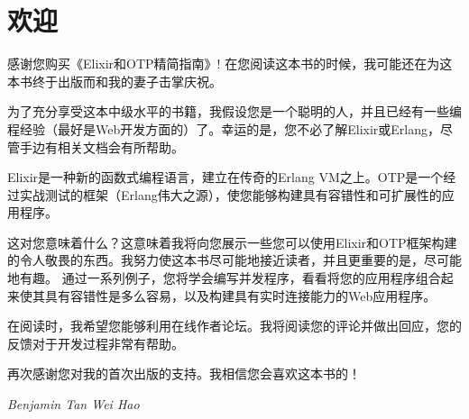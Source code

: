 \chapter*{欢迎}\label{welcome}

感谢您购买《Elixir和OTP精简指南》! 在您阅读这本书的时候，我可能还在为这本书终于出版而和我的妻子击掌庆祝。

为了充分享受这本中级水平的书籍，我假设您是一个聪明的人，并且已经有一些编程经验（最好是Web开发方面的）了。幸运的是，您不必了解Elixir或Erlang，尽管手边有相关文档会有所帮助。

Elixir是一种新的函数式编程语言，建立在传奇的Erlang VM之上。OTP是一个经过实战测试的框架（Erlang伟大之源），使您能够构建具有容错性和可扩展性的应用程序。

这对您意味着什么？这意味着我将向您展示一些您可以使用Elixir和OTP框架构建的令人敬畏的东西。我努力使这本书尽可能地接近读者，并且更重要的是，尽可能地有趣。
通过一系列例子，您将学会编写并发程序，看看将您的应用程序组合起来使其具有容错性是多么容易，以及构建具有实时连接能力的Web应用程序。

在阅读时，我希望您能够利用在线作者论坛。我将阅读您的评论并做出回应，您的反馈对于开发过程非常有帮助。

再次感谢您对我的首次出版的支持。我相信您会喜欢这本书的！

\vspace{2cm} 

\hspace{0.5\textwidth}\textit{Benjamin Tan Wei Hao}

